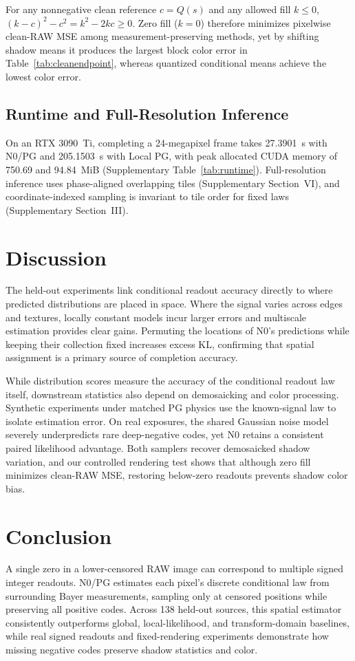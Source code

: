 \documentclass[10pt,twocolumn,journal]{IEEEtran}
\begin{document}
For any nonnegative clean reference $c=Q(s)$ and any allowed fill $k\leq0$, $(k-c)^2-c^2=k^2-2kc\geq0$. Zero fill ($k=0$) therefore minimizes pixelwise clean-RAW MSE among measurement-preserving methods, yet by shifting shadow means it produces the largest block color error in Table~\ref{tab:cleanendpoint}, whereas quantized conditional means achieve the lowest color error.

\subsection{Runtime and Full-Resolution Inference}\label{sec:runtime}
On an RTX 3090~Ti, completing a 24-megapixel frame takes 27.3901~s with N0/PG and 205.1503~s with Local PG, with peak allocated CUDA memory of 750.69 and 94.84~MiB (Supplementary Table~\ref{tab:runtime}). Full-resolution inference uses phase-aligned overlapping tiles (Supplementary Section~VI), and coordinate-indexed sampling is invariant to tile order for fixed laws (Supplementary Section~III).

\section{Discussion}
The held-out experiments link conditional readout accuracy directly to where predicted distributions are placed in space. Where the signal varies across edges and textures, locally constant models incur larger errors and multiscale estimation provides clear gains. Permuting the locations of N0's predictions while keeping their collection fixed increases excess KL, confirming that spatial assignment is a primary source of completion accuracy.

While distribution scores measure the accuracy of the conditional readout law itself, downstream statistics also depend on demosaicking and color processing. Synthetic experiments under matched PG physics use the known-signal law to isolate estimation error. On real exposures, the shared Gaussian noise model severely underpredicts rare deep-negative codes, yet N0 retains a consistent paired likelihood advantage. Both samplers recover demosaicked shadow variation, and our controlled rendering test shows that although zero fill minimizes clean-RAW MSE, restoring below-zero readouts prevents shadow color bias.

\section{Conclusion}
A single zero in a lower-censored RAW image can correspond to multiple signed integer readouts. N0/PG estimates each pixel's discrete conditional law from surrounding Bayer measurements, sampling only at censored positions while preserving all positive codes. Across 138 held-out sources, this spatial estimator consistently outperforms global, local-likelihood, and transform-domain baselines, while real signed readouts and fixed-rendering experiments demonstrate how missing negative codes preserve shadow statistics and color.
\end{document}

